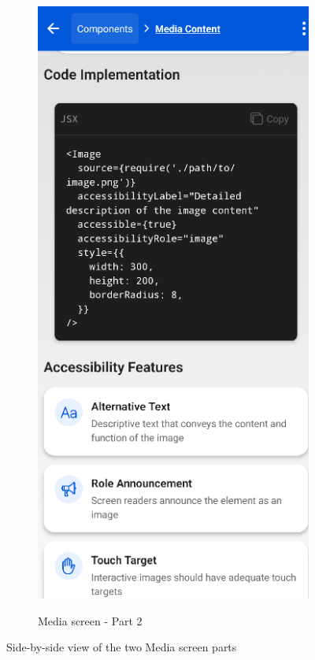 \begin{figure}[ht]
\begin{subfigure}[b]{0.48\textwidth}
        \label{fig:media-left}
    \end{subfigure}
    \hfill
    \begin{subfigure}[b]{0.48\textwidth}
        \centering
        \includegraphics[width=\linewidth, alt={Second part of the Media screen}]{img/media2.png}
        \caption{Media screen - Part 2}
        \label{fig:media-right}
    \end{subfigure}
    \caption{Side-by-side view of the two Media screen parts}
    \label{fig:media_screens_sidebyside}
\end{figure}
\FloatBarrier

